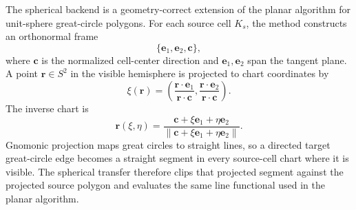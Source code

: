 \documentclass[11pt]{article}
\begin{document}
The spherical backend is a geometry-correct extension of the planar algorithm
for unit-sphere great-circle polygons.  For each source cell \(K_s\), the method
constructs an orthonormal frame
\[
  \{\mathbf{e}_1,\mathbf{e}_2,\mathbf{c}\},
\]
where \(\mathbf{c}\) is the normalized cell-center direction and
\(\mathbf{e}_1,\mathbf{e}_2\) span the tangent plane.  A point
\(\mathbf{r}\in S^2\) in the visible hemisphere is projected to chart
coordinates by
\begin{equation}
  \xi(\mathbf{r}) =
  \left(
  \frac{\mathbf{r}\cdot\mathbf{e}_1}{\mathbf{r}\cdot\mathbf{c}},
  \frac{\mathbf{r}\cdot\mathbf{e}_2}{\mathbf{r}\cdot\mathbf{c}}
  \right).
  \label{eq:gnomonic}
\end{equation}
The inverse chart is
\begin{equation}
  \mathbf{r}(\xi,\eta)
  =
  \frac{\mathbf{c}+\xi\mathbf{e}_1+\eta\mathbf{e}_2}
       {\|\mathbf{c}+\xi\mathbf{e}_1+\eta\mathbf{e}_2\|}.
  \label{eq:inverse_gnomonic}
\end{equation}
Gnomonic projection maps great circles to straight lines, so a directed target
great-circle edge becomes a straight segment in every source-cell chart where it
is visible.  The spherical transfer therefore clips that projected segment
against the projected source polygon and evaluates the same line functional used
in the planar algorithm.
\end{document}
